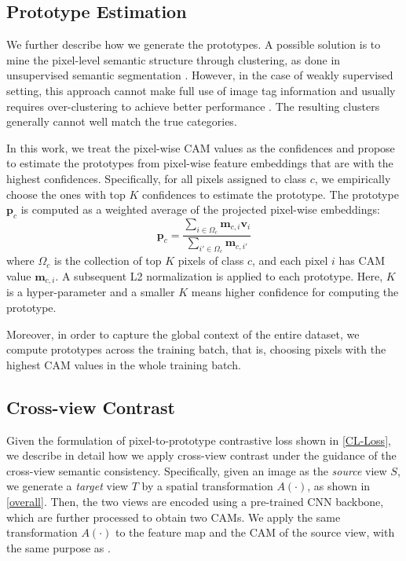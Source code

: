 \documentclass[10pt,twocolumn,letterpaper]{article}
\begin{document}
\subsection{Prototype Estimation}
We further describe how we generate the prototypes.
A possible solution is to mine the pixel-level semantic structure through clustering, as done in unsupervised semantic segmentation \cite{picie}.
However, in the case of weakly supervised setting, this approach cannot make full use of image tag information and usually requires over-clustering to achieve better performance \cite{chang2020weaklySubCategory, tian2017deepcluster}. The resulting clusters generally cannot well match the true categories. 


In this work, we treat the pixel-wise CAM values as the confidences and propose to estimate the prototypes from pixel-wise feature embeddings that are with the highest confidences.
Specifically, for all pixels assigned to class $c$,
we empirically choose the ones with top $K$ confidences to estimate the prototype.
The prototype $\boldsymbol{p}_c$ is computed as a weighted average of the projected pixel-wise embeddings:
\begin{equation}
    \boldsymbol{p}_c = \frac{\sum_{i \in \Omega_c} \boldsymbol{m}_{c,i} \boldsymbol{v}_{i}}{\sum_{i'\in \Omega_c} \boldsymbol{m}_{c,i'}}
\end{equation}
where $\Omega_c$ is the collection of top $K$ pixels of class $c$, and each pixel $i$ has CAM value $\boldsymbol{m}_{c, i}$.
A subsequent L2 normalization is applied to each prototype. Here, $K$ is a hyper-parameter and a smaller $K$ means higher confidence for computing the prototype.

Moreover, in order to capture the global context of the entire dataset, we compute prototypes across the training batch, that is, choosing pixels with the highest CAM values in the whole training batch.






\subsection{Cross-view Contrast}
Given the formulation of pixel-to-prototype contrastive loss shown in \cref{CL-Loss}, we describe in detail how we apply cross-view contrast under the guidance of the cross-view semantic consistency.
Specifically, given an image as the \textit{source} view $S$, we generate a \textit{target} view $T$ by a spatial transformation $A(\cdot)$, as shown in \cref{overall}.
Then, the two views are encoded using a pre-trained CNN backbone, which are further processed to obtain two CAMs.
We apply the same transformation $A(\cdot)$ to the feature map and the CAM of the source view, with the same purpose as \cite{wang2020selfSEAM}.
\end{document}
